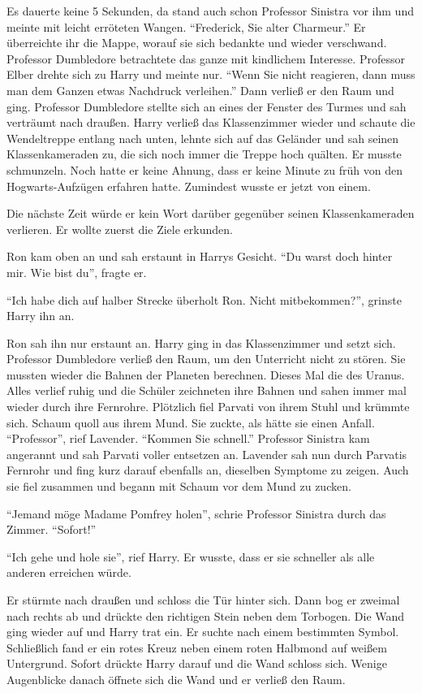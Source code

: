 Es dauerte keine 5 Sekunden, da stand auch schon Professor Sinistra vor ihm und meinte mit leicht erröteten Wangen. \enquote{Frederick, Sie alter Charmeur.} Er überreichte ihr die Mappe, worauf sie sich bedankte und wieder verschwand. Professor Dumbledore betrachtete das ganze mit kindlichem Interesse. Professor Elber drehte sich zu Harry und meinte nur. \enquote{Wenn Sie nicht reagieren, dann muss man dem Ganzen etwas Nachdruck verleihen.} Dann verließ er den Raum und ging. Professor Dumbledore stellte sich an eines der Fenster des Turmes und sah verträumt nach draußen. Harry verließ das Klassenzimmer wieder und schaute die Wendeltreppe entlang nach unten, lehnte sich auf das Geländer und sah seinen Klassenkameraden zu, die sich noch immer die Treppe hoch quälten. Er musste schmunzeln. Noch hatte er keine Ahnung, dass er keine Minute zu früh von den Hogwarts-Aufzügen erfahren hatte. Zumindest wusste er jetzt von einem.

Die nächste Zeit würde er kein Wort darüber gegenüber seinen Klassenkameraden verlieren. Er wollte zuerst die Ziele erkunden.

Ron kam oben an und sah erstaunt in Harrys Gesicht. \enquote{Du warst doch hinter mir. Wie bist du\abs}, fragte er.

\enquote{Ich habe dich auf halber Strecke überholt Ron. Nicht mitbekommen?}, grinste Harry ihn an.

Ron sah ihn nur erstaunt an. Harry ging in das Klassenzimmer und setzt sich. Professor Dumbledore verließ den Raum, um den Unterricht nicht zu stören. Sie mussten wieder die Bahnen der Planeten berechnen. Dieses Mal die des Uranus. Alles verlief ruhig und die Schüler zeichneten ihre Bahnen und sahen immer mal wieder durch ihre Fernrohre. Plötzlich fiel Parvati von ihrem Stuhl und krümmte sich. Schaum quoll aus ihrem Mund. Sie zuckte, als hätte sie einen Anfall. \enquote{Professor}, rief Lavender. \enquote{Kommen Sie schnell.} Professor Sinistra kam angerannt und sah Parvati voller entsetzen an. Lavender sah nun durch Parvatis Fernrohr und fing kurz darauf ebenfalls an, dieselben Symptome zu zeigen. Auch sie fiel zusammen und begann mit Schaum vor dem Mund zu zucken.

\enquote{Jemand möge Madame Pomfrey holen}, schrie Professor Sinistra durch das Zimmer. \enquote{Sofort!}

\enquote{Ich gehe und hole sie}, rief Harry. Er wusste, dass er sie schneller als alle anderen erreichen würde.

Er stürmte nach draußen und schloss die Tür hinter sich. Dann bog er zweimal nach rechts ab und drückte den richtigen Stein neben dem Torbogen. Die Wand ging wieder auf und Harry trat ein. Er suchte nach einem bestimmten Symbol. Schließlich fand er ein rotes Kreuz neben einem roten Halbmond auf weißem Untergrund. Sofort drückte Harry darauf und die Wand schloss sich. Wenige Augenblicke danach öffnete sich die Wand und er verließ den Raum.


